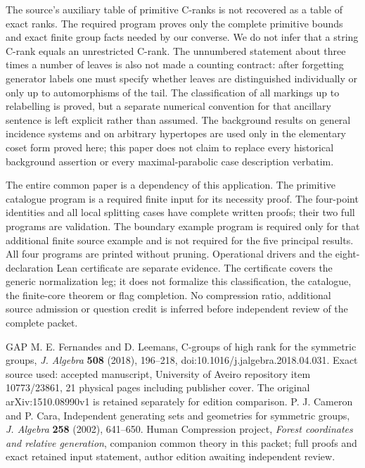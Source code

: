 The source's auxiliary table of primitive C-ranks is not recovered as
a table of exact ranks. The required program proves only the complete
primitive bounds and exact finite group facts needed by our converse.
We do not infer that a string C-rank equals an unrestricted C-rank.
The unnumbered statement about three times a number of leaves is also
not made a counting contract: after forgetting generator labels one
must specify whether leaves are distinguished individually or only
up to automorphisms of the tail. The classification of all markings
up to relabelling is proved, but a separate numerical convention for
that ancillary sentence is left explicit rather than assumed.
The background results on general incidence systems and on arbitrary
hypertopes are used only in the elementary coset form proved here;
this paper does not claim to replace every historical background
assertion or every maximal-parabolic case description verbatim.

The entire common paper is a dependency of this application. The
primitive catalogue program is a required finite input for its
necessity proof. The four-point identities and all local splitting
cases have complete written proofs; their two full programs are
validation. The boundary example program is required only for that
additional finite source example and is not required for the five
principal results. All four programs are printed without pruning.
Operational drivers and the eight-declaration Lean certificate are
separate evidence. The certificate covers the generic normalization
leg; it does not formalize this classification, the catalogue, the
finite-core theorem or flag completion. No compression ratio, additional
source admission or question credit is inferred before independent
review of the complete packet.

\begin{thebibliography}{GAP}
 M. E. Fernandes and D. Leemans,
C-groups of high rank for the symmetric groups,
\emph{J. Algebra} \textbf{508} (2018), 196--218,
doi:10.1016/j.jalgebra.2018.04.031. Exact source used:
accepted manuscript, University of Aveiro repository item 10773/23861,
21 physical pages including publisher cover. The original
arXiv:1510.08990v1 is retained separately for edition comparison.
 P. J. Cameron and P. Cara,
Independent generating sets and geometries for symmetric groups,
\emph{J. Algebra} \textbf{258} (2002), 641--650.
 Human Compression project,
\emph{Forest coordinates and relative generation},
companion common theory in this packet; full proofs and exact retained
input statement, author edition awaiting independent review.
\end{thebibliography}

